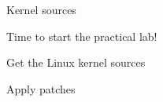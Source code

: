 \setuplabframe
{Kernel sources}
{
  Time to start the practical lab!
  \startitemize
  \item Get the Linux kernel sources
  \item Apply patches
  \stopitemize
}
